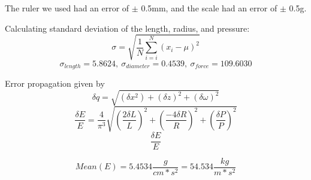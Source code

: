 \documentclass{article}
\begin{document}
The ruler we used had an error of $\pm$ 0.5mm, and the scale had an error of $\pm$ 0.5g.

Calculating standard deviation of the length, radius, and pressure:
$$\sigma = \sqrt{\frac{1}{N}\sum_{i=i}^N{(x_i-\mu )^2}}$$
$$\sigma _{length} = 5.8624,\ \sigma _{diameter} = 0.4539,\ \sigma _{force} = 109.6030$$

Error propagation given by
$$\delta q = \sqrt{(\delta x^2)+(\delta z)^2 + (\delta \omega )^2}$$
$$\frac{\delta E}{E} = \frac{4}{\pi ^3}\sqrt{(\frac{2\delta L}{L})^2 + (\frac{-4\delta R}{R})^2 + (\frac{\delta P}{P})^2}$$
$$\frac{\delta E}{E}$$

$$Mean(E) = 5.4534 \frac{g}{cm*s^2} = 54.534 \frac{kg}{m*s^2}$$
\end{document}
